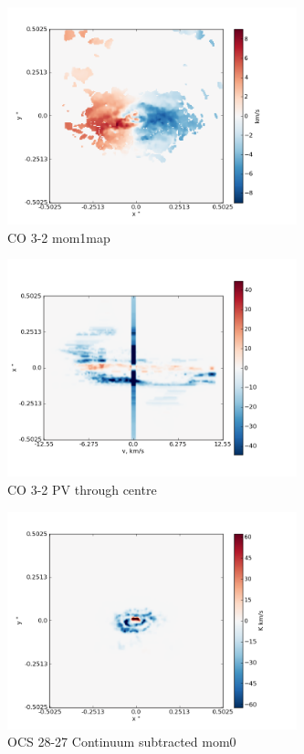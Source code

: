 \documentclass[useAMS,usenatbib]{mn2e}
\begin{document}
\begin{figure}
 \includegraphics[width=84mm]{Figures/sim/imageCO_3-2_30deg_mom1.png}

 \caption{CO 3-2 mom1map}
\end{figure}

\begin{figure}
 \includegraphics[width=84mm]{Figures/sim/imageCO_3-2_30deg_PV_centre.png}

 \caption{CO 3-2 PV through centre}
\end{figure}



\begin{figure}
 \includegraphics[width=84mm]{Figures/sim/imageOCS_28-27_30deg_contSub.png}

 \caption{OCS 28-27 Continuum subtracted mom0}
\end{figure}
\end{document}
